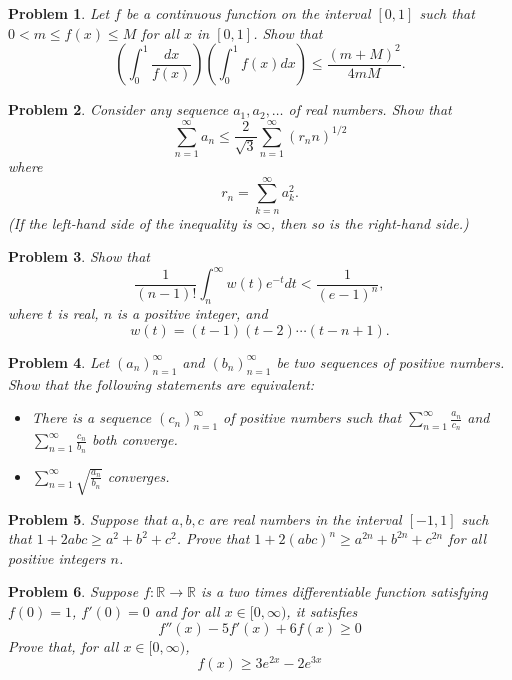 \documentclass[12pt]{article}
\newtheorem{problem}{Problem}
\begin{document}
\begin{problem}
Let $f$ be a continuous function on the interval $[0, 1]$ such that $0 < m \leq f(x) \leq M$ for all $x$ in $[0, 1]$. Show that
\[
\left( \int_0^1 \frac{dx}{f(x)} \right) \left( \int_0^1 f(x) dx \right)
\leq \frac{(m + M)^2}{4mM}.
\]
\end{problem}

\begin{problem}
Consider any sequence $a_1, a_2, \ldots$ of real numbers. Show that
\[
\sum_{n=1}^{\infty} a_n \leq \frac{2}{\sqrt{3}} \sum_{n=1}^{\infty} \left( r_n n \right)^{1/2}
\]
where
\[
r_n = \sum_{k=n}^{\infty} a_k^2.
\]
(If the left-hand side of the inequality is $\infty$, then so is the right-hand side.)
\end{problem}

\begin{problem}
\textbf{\textcolor{red}{\heart}}
Show that
\[
\frac{1}{(n-1)!} \int_n^{\infty} w(t) e^{-t} dt < \frac{1}{(e-1)^n},
\]
where $t$ is real, $n$ is a positive integer, and
\[
w(t) = (t-1)(t-2) \cdots (t-n+1).
\]
\end{problem}

\begin{problem}
Let $(a_n)_{n=1}^{\infty}$ and $(b_n)_{n=1}^{\infty}$ be two sequences of positive numbers. Show that the following statements are equivalent:
\begin{itemize}
  \item There is a sequence $(c_n)_{n=1}^{\infty}$ of positive numbers such that $\sum_{n=1}^{\infty} \frac{a_n}{c_n}$ and $\sum_{n=1}^{\infty} \frac{c_n}{b_n}$ both converge.
  \item $\sum_{n=1}^{\infty} \sqrt{\frac{a_n}{b_n}}$ converges.
\end{itemize}
\end{problem}

\begin{problem}
Suppose that $a, b, c$ are real numbers in the interval $[-1, 1]$ such that $1 + 2abc \geq a^2 + b^2 + c^2$. Prove that $1 + 2(abc)^n \geq a^{2n} + b^{2n} + c^{2n}$ for all positive integers $n$.
\end{problem}

\begin{problem}
Suppose $f : \mathbb{R} \rightarrow \mathbb{R}$ is a two times differentiable function satisfying $f(0) = 1$, $f'(0) = 0$ and for all $x \in [0, \infty)$, it satisfies
\[
f''(x) - 5 f'(x) + 6 f(x) \geq 0
\]
Prove that, for all $x \in [0, \infty)$,
\[
f(x) \geq 3e^{2x} - 2e^{3x}
\]
\end{problem}
\end{document}
